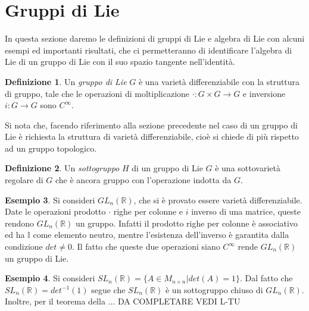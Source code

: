 \documentclass[12pt,a4paper]{report}
\theoremstyle{definition}
\newtheorem{Def}{Definizione}[chapter]
\theoremstyle{definition}
\newtheorem{Ex}[Def]{Esempio}
\theoremstyle{definition}
\theoremstyle{definition}
\begin{document}
\section{Gruppi di Lie}
In questa sezione daremo le definizioni di gruppi di Lie e algebra di Lie con alcuni esempi ed importanti risultati, che ci permetteranno di identificare l'algebra di Lie di un gruppo di Lie con il suo spazio tangente nell'identità.
\begin{Def}
	Un \textit{gruppo di Lie} $G$ è una varietà differenziabile con la struttura di gruppo, tale che le operazioni di moltiplicazione $\cdot:G\times G\rightarrow G$ e inversione $i:G\rightarrow G$ sono $C^\infty$.
\end{Def}
Si nota che, facendo riferimento alla sezione precedente nel caso di un gruppo di Lie è richiesta la struttura di varietà differenziabile, cioè si chiede di più rispetto ad un gruppo topologico.
\begin{Def}
	Un \textit{sottogruppo} $H$ di un gruppo di Lie $G$ è una sottovarietà regolare di $G$ che è ancora gruppo con l'operazione indotta da $G$.
\end{Def}
\begin{Ex}
	Si consideri $GL_n(\mathbb{R})$, che si è provato essere varietà differenziabile. Date le operazioni prodotto $\cdot$ righe per colonne e $i$ inverso di una matrice, queste rendono $GL_n(\mathbb{R})$ un gruppo. Infatti il prodotto righe per colonne è associativo ed ha $\mathbb{I}$ come elemento neutro, mentre l'esistenza dell'inverso è garantita dalla condizione $det\neq 0$. Il fatto che queste due operazioni siano $C^\infty$ rende $GL_n(\mathbb{R})$ un gruppo di Lie.
\end{Ex}
\begin{Ex}
	Si consideri $SL_n(\mathbb{R})=\{A\in M_{n\times n}| det(A)=1\}$. Dal fatto che $SL_n(\mathbb{R})=det^{-1}(1)$ segue che $SL_n(\mathbb{R})$ è un sottogruppo chiuso di $GL_n(\mathbb{R})$. Inoltre, per il teorema della ... DA COMPLETARE VEDI L-TU
\end{Ex}
\end{document}
